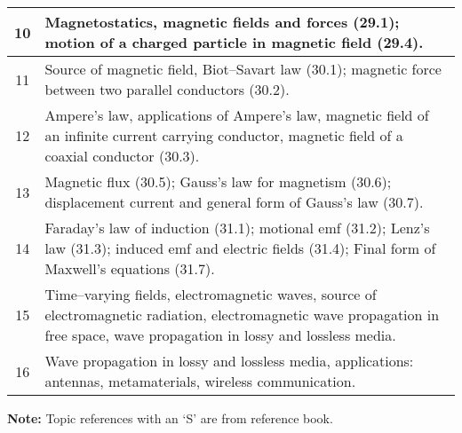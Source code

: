 \documentclass[12pt,a4paper]{article}
\begin{document}
\begin{center}
\begin{longtable}{|c|p{13cm}|}
		\hline
		10 \rule{0pt}{2.6ex} & Magnetostatics, magnetic fields and forces (29.1); motion of a charged particle in magnetic field (29.4).\\
		\hline
		11 \rule{0pt}{2.6ex} & Source of magnetic field, Biot--Savart law (30.1); magnetic force between two parallel conductors (30.2).\\
		\hline
		12 \rule{0pt}{2.6ex} & Ampere's law, applications of Ampere's law, magnetic field of an infinite current carrying conductor, magnetic field of a coaxial conductor (30.3).\\
		\hline
		13 \rule{0pt}{2.6ex} & Magnetic flux (30.5); Gauss's law for magnetism (30.6); displacement current and general form of Gauss's law (30.7).\\
		\hline
		14 \rule{0pt}{2.6ex} & Faraday's law of induction (31.1); motional emf (31.2); Lenz's law (31.3); induced emf and electric fields (31.4); Final form of Maxwell's equations (31.7).\\
		\hline
		15 \rule{0pt}{2.6ex} & Time--varying fields, electromagnetic waves, source of electromagnetic radiation, electromagnetic wave propagation in free space, wave propagation in lossy and lossless media.\\
		\hline
		16 \rule{0pt}{2.6ex} & Wave propagation in lossy and lossless media, applications: antennas, metamaterials, wireless communication.\\
	\hline \hline
	\end{longtable}
\end{center}
\noindent \textbf{Note:} Topic references with an `S' are from reference book.
\end{document}
